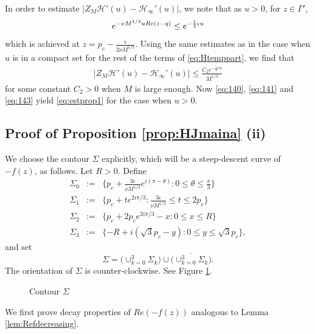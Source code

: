 \documentclass[11pt]{article}
\begin{document}
In order to estimate $| Z_M \mathcal{H}'(u) -
\mathcal{H}_\infty'(u) |$, we note that as $u>0$, for $z\in
\Gamma'$,
\begin{equation}
   e^{-\nu M^{1/3} u Re(z-q)}
  \le e^{-\frac12 \epsilon u}
\end{equation}
which is achieved at $z=p_c-\frac{\epsilon}{2\nu M^{1/3}}$.
Using the same estimates as in the case when $u$ is in a compact set for
the rest of the terms of \eqref{eq:Htemppart}, we find that
\begin{equation}\label{eq:143}
\begin{split}
  | Z_M \mathcal{H}'(u) - \mathcal{H}_\infty'(u) | \le
  \frac{C_2e^{-\frac12 \epsilon u}}{M^{1/3}}
\end{split}
\end{equation}
for some constant $C_2>0$ when $M$ is large enough.
Now \eqref{eq:140}, \eqref{eq:141} and \eqref{eq:143} yield
\eqref{eq:estprop1} for the case when $u>0$.




\subsection{Proof of Proposition \ref{prop:HJmaina} (ii)}\label{sec:Jmain}


We choose the contour $\Sigma$ explicitly, which will be a
steep-descent curve of $-f(z)$, as follows. Let $R>0$. Define
\begin{eqnarray}
  \Sigma_0 &:=& \{ p_c+ \frac{3\epsilon}{\nu M^{1/3}}e^{i(\pi-\theta)} :
0\le \theta\le  \frac\pi3\} \\
  \Sigma_1 &:=& \{ p_c+ te^{2i\pi/3} :
\frac{3\epsilon}{\nu M^{1/3}} \le t \le 2 p_c
  \} \\
  \Sigma_2 &:=& \{ p_c+2 p_ce^{2i\pi/3} - x : 0\le x\le R\} \\
  \Sigma_3 &:=& \{ -R+i(\sqrt{3} p_c- y) : 0\le y\le \sqrt{3}p_c \},
\end{eqnarray}
and set
\begin{equation}
  \Sigma= \bigl( \cup_{k=0}^3 \Sigma_k \bigr)
\cup \overline{\bigl( \cup_{k=0}^3 \Sigma_k \bigr)}.
\end{equation}
The orientation of $\Sigma$ is counter-clockwise.
See Figure \ref{fig:Steep2}.
\begin{figure}[ht]
\centerline{\epsfxsize=11cm} \caption{Contour
$\Sigma$}\label{fig:Steep2}
\end{figure}
We first prove decay properties of $Re(-f(z))$ analogous
to Lemma \ref{lem:Refdecreasing}.
\end{document}
